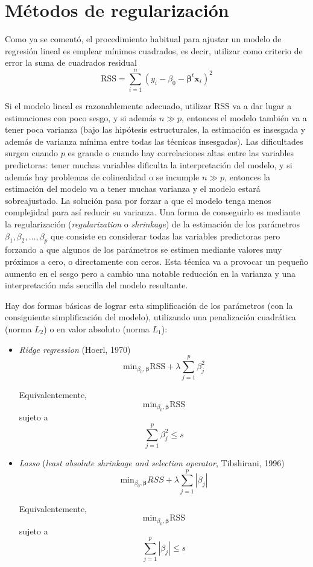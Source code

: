 \documentclass[
]{book}
\theoremstyle{break}
\theoremstyle{definition}
\theoremstyle{definition}
\theoremstyle{definition}
\theoremstyle{remark}
\begin{document}
\hypertarget{shrinkage}{%
\section{Métodos de regularización}\label{shrinkage}}

Como ya se comentó, el procedimiento habitual para ajustar un modelo de regresión lineal es emplear mínimos cuadrados, es decir, utilizar como criterio de error la suma de cuadrados residual
\[\mbox{RSS} = \sum\limits_{i=1}^{n}\left(  y_{i} - \beta_0 - \boldsymbol{\beta}^t \mathbf{x}_{i} \right)^{2}\]

Si el modelo lineal es razonablemente adecuado, utilizar \(\mbox{RSS}\) va a dar lugar a estimaciones con poco sesgo, y si además \(n\gg p\), entonces el modelo también va a tener poca varianza (bajo las hipótesis estructurales, la estimación es insesgada y además de varianza mínima entre todas las técnicas insesgadas).
Las dificultades surgen cuando \(p\) es grande o cuando hay correlaciones altas entre las variables predictoras: tener muchas variables dificulta la interpretación del modelo, y si además hay problemas de colinealidad o se incumple \(n\gg p\), entonces la estimación del modelo va a tener muchas varianza y el modelo estará sobreajustado.
La solución pasa por forzar a que el modelo tenga menos complejidad para así reducir su varianza.
Una forma de conseguirlo es mediante la regularización (\emph{regularization} o \emph{shrinkage}) de la estimación de los parámetros \(\beta_1, \beta_2,\ldots, \beta_p\) que consiste en considerar todas las variables predictoras pero forzando a que algunos de los parámetros se estimen mediante valores muy próximos a cero, o directamente con ceros.
Esta técnica va a provocar un pequeño aumento en el sesgo pero a cambio una notable reducción en la varianza y una interpretación más sencilla del modelo resultante.

Hay dos formas básicas de lograr esta simplificación de los parámetros (con la consiguiente simplificación del modelo), utilizando una penalización cuadrática (norma \(L_2\)) o en valor absoluto (norma \(L_1\)):

\begin{itemize}
\item
  \emph{Ridge regression} (Hoerl, 1970)
  \[\mbox{min}_{\beta_0, \boldsymbol{\beta}} \mbox{RSS} + \lambda\sum_{j=1}^{p}\beta_{j}^{2}\]

  Equivalentemente,
  \[\mbox{min}_{\beta_0, \boldsymbol{\beta}} \mbox{RSS}\]
  sujeto a
  \[\sum_{j=1}^{p}\beta_{j}^{2} \le s\]
\item
  \emph{Lasso} (\emph{least absolute shrinkage and selection operator}, Tibshirani, 1996)
  \[\mbox{min}_{\beta_0, \boldsymbol{\beta}} RSS + \lambda\sum_{j=1}^{p}|\beta_{j}|\]

  Equivalentemente,
  \[\mbox{min}_{\beta_0, \boldsymbol{\beta}} \mbox{RSS}\]
  sujeto a
  \[\sum_{j=1}^{p}|\beta_{j}| \le s\]
\end{itemize}
\end{document}
